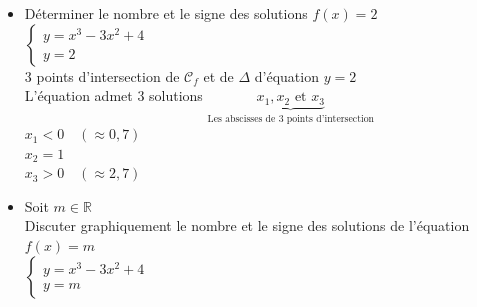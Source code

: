 \begin{itemize}
    \item Déterminer le nombre et le signe des solutions $f(x) =2$ \\
    $\begin{cases}
        y = x^3 -3x^2 +4\\
        y = 2
    \end{cases}$ \\
    
    3 points d'intersection de $\mathscr{C}_f$ et de $\Delta$ d'équation $y=2$ \\
    
    L'équation admet 3 solutions $\underbrace{x_1, x_2 \text{ et }x_3}_{\text{Les abscisses de 3 points d'intersection}}$ \\
    
    $x_1 < 0 \quad (\approx 0,7)$\\
    $x_2 = 1 $\\
    $x_3 > 0 \quad (\approx 2,7)$\\
    
    \item Soit $m \in \mathbb{R}$ \\
    
    Discuter graphiquement le nombre et le signe des solutions de l'équation $f(x) = m $\\
    
    $\begin{cases}
        y = x^3 -3x^2 +4\\
        y = m 
    \end{cases}$ \\

\bigskip

\end{itemize}
